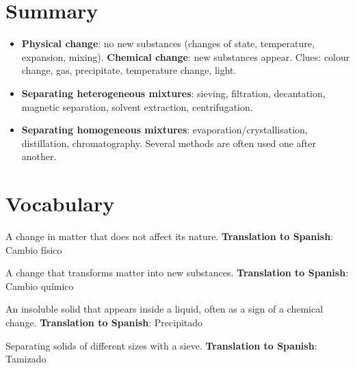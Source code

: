 
\section*{Summary}

\begin{itemize}
    \item \textbf{Physical change}: no new substances (changes of state, temperature, expansion, mixing). \textbf{Chemical change}: new substances appear. Clues: colour change, gas, precipitate, temperature change, light.
    \item \textbf{Separating heterogeneous mixtures}: sieving, filtration, decantation, magnetic separation, solvent extraction, centrifugation.
    \item \textbf{Separating homogeneous mixtures}: evaporation/crystallisation, distillation, chromatography. Several methods are often used one after another.
\end{itemize}

\section{Vocabulary}

\begin{vocabulary}
    A change in matter that does not affect its nature. \newline
    \textbf{Translation to Spanish}: Cambio físico
\end{vocabulary}

\begin{vocabulary}
    A change that transforms matter into new substances. \newline
    \textbf{Translation to Spanish}: Cambio químico
\end{vocabulary}

\begin{vocabulary}[Precipitate]
    An insoluble solid that appears inside a liquid, often as a sign of a chemical change. \newline
    \textbf{Translation to Spanish}: Precipitado
\end{vocabulary}

\begin{vocabulary}[Sieving]
    Separating solids of different sizes with a sieve. \newline
    \textbf{Translation to Spanish}: Tamizado
\end{vocabulary}

